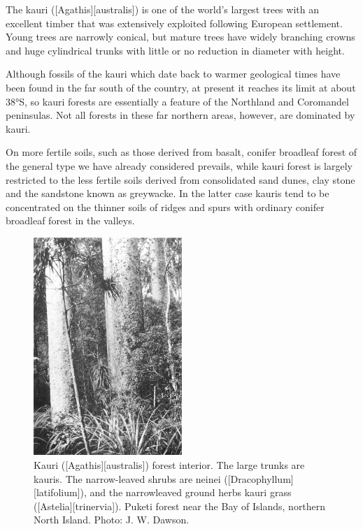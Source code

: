 The kauri ([Agathis][australis]) is one of the world's largest trees with an excellent timber that was extensively exploited following European settlement.
Young trees are narrowly conical, but mature trees have widely branching crowns and huge cylindrical trunks with little or no reduction in diameter with height.

Although fossils of the kauri which date back to warmer geological times have been found in the far south of the country, at present it reaches its limit at about 38°S, so kauri forests are essentially a feature of the Northland and Coromandel peninsulas.
Not all forests in these far northern areas, however, are dominated by kauri.

On more fertile soils, such as those derived from basalt, conifer broadleaf forest of the general type we have already considered prevails, while kauri forest is largely restricted to the less fertile soils derived from consolidated sand dunes, clay stone and the sandstone known as greywacke.
In the latter case kauris tend to be concentrated on the thinner soils of ridges and spurs with ordinary conifer broadleaf forest in the valleys.

\begin{figure}
	\includegraphics[width=0.5\textwidth]{graphics/figure65kauri.jpg}
	\centering
	\caption[Kauri forest interior]{Kauri ([Agathis][australis]) forest interior.
	The large trunks are kauris.
	The narrow-leaved shrubs are neinei ([Dracophyllum][latifolium]), and the narrowleaved ground herbs kauri grass ([Astelia][trinervia]).
	Puketi forest near the Bay of Islands, northern North Island.
	Photo:  J. W. Dawson.}%
	\label{fig:65kauri}
\end{figure}

